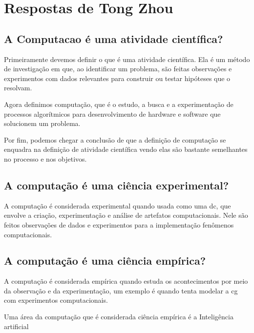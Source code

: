 \section{Respostas de Tong Zhou}

\subsection{A \gls{Computacao} é uma atividade científica?}

Primeiramente devemos definir o que é uma atividade científica. Ela é um método de investigação em que, ao identificar um problema, são feitas observações e experimentos com dados relevantes para construir ou testar hipóteses que o resolvam.

Agora definimos computação, que é o estudo, a busca e a experimentação de processos algorítmicos para desenvolvimento de hardware e software que solucionem um problema. 
   
Por fim, podemos chegar a conclusão de que a definição de computação se enquadra na definição de atividade científica vendo elas são bastante semelhantes no processo e nos objetivos. 

\subsection{A computação é uma ciência experimental?}

A computação é considerada experimental quando usada como uma \gls{dc}, que envolve a criação, experimentação e análise de artefatos computacionais. Nele são feitos observações de dados e  experimentos para a implementação fenômenos computacionais.


\subsection{A computação é uma ciência empírica?}

A computação é considerada empírica quando estuda os acontecimentos por meio da observação e da experimentação, um exemplo é quando tenta modelar a \gls{cg} com experimentos computacionais. 

Uma área da computação que é considerada ciência empírica é a Inteligência artificial
